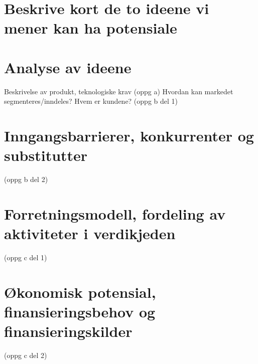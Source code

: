 \section{Beskrive kort de to ideene vi mener kan ha potensiale}

\section{Analyse av ideene}
Beskrivelse av produkt, teknologiske krav (oppg a)
Hvordan kan markedet segmenteres/inndeles? Hvem er kundene? (oppg b del 1)

\section{Inngangsbarrierer, konkurrenter og substitutter}
(oppg b del 2)

\section{Forretningsmodell, fordeling av aktiviteter i verdikjeden}
(oppg c del 1)

\section{Økonomisk potensial, finansieringsbehov og finansieringskilder} 
(oppg c del 2)